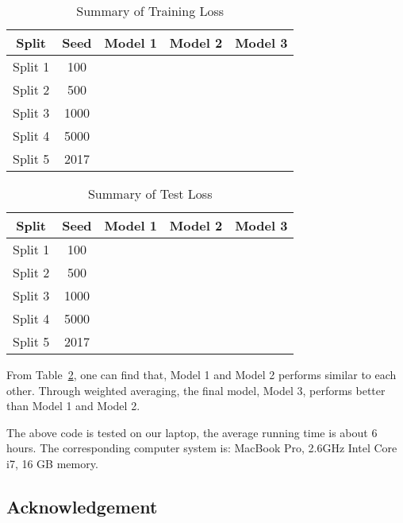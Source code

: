 \documentclass[12pt]{article}
\begin{document}
\begin{table}[htb]
 \caption{Summary of Training Loss} \label{result}
 \vspace{0.1in}
\begin{center}
  \begin{tabular}{  c  c  c  c  c}
    \hline
    Split            & Seed        & Model 1    & Model 2    & Model 3 \\ \hline
    Split 1         & 100    \\ \hline
    Split 2         & 500    \\ \hline
    Split 3         & 1000    \\ \hline
    Split 4         & 5000    \\ \hline
    Split 5         & 2017    \\ \hline
  \end{tabular}
\end{center}
\end{table}

\begin{table}[htb]
 \caption{Summary of Test Loss} \label{result}
 \vspace{0.1in}
\begin{center}
  \begin{tabular}{  c  c  c  c  c}
    \hline
    Split            & Seed        & Model 1    & Model 2    & Model 3 \\ \hline
    Split 1         & 100    \\ \hline
    Split 2         & 500    \\ \hline
    Split 3         & 1000    \\ \hline
    Split 4         & 5000    \\ \hline
    Split 5         & 2017    \\ \hline
  \end{tabular}
\end{center}
\end{table}


From Table~\ref{result}, one can find that, Model 1 and Model 2 performs similar to each other. Through weighted averaging, the final model, Model 3, performs better than Model 1 and Model 2.

The above code is tested on our laptop, the average running time is about 6 hours. The corresponding computer system is:
MacBook Pro, 2.6GHz Intel Core i7, 16 GB memory.  

\subsection*{Acknowledgement}
\end{document}
